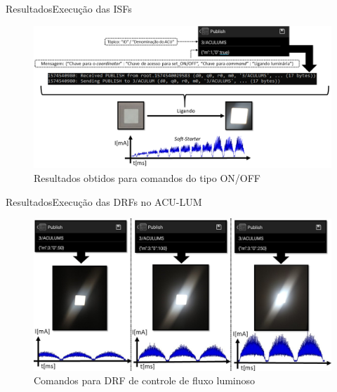 \begin{frame}{Resultados}{Execução das ISFs}
\begin{figure}[htp]
	\centering
	\caption{ \centering\small{{Resultados obtidos para comandos do tipo ON/OFF}}}
	\includegraphics[width=1\linewidth]{img/isf2.png}
    \hspace{5cm}
    \vspace{1cm}
\end{figure}
\end{frame}

\begin{frame}{Resultados}{Execução das DRFs no ACU-LUM}
\vspace{-0.6cm}
\begin{figure}[htp]
	\centering
	\caption{ \centering\small{{Comandos para DRF de controle de fluxo luminoso}}}
	\includegraphics[width=1\linewidth]{img/apDRF1.jpg}
    \hspace{5cm}
    \vspace{1cm}
\end{figure}
\end{frame}

